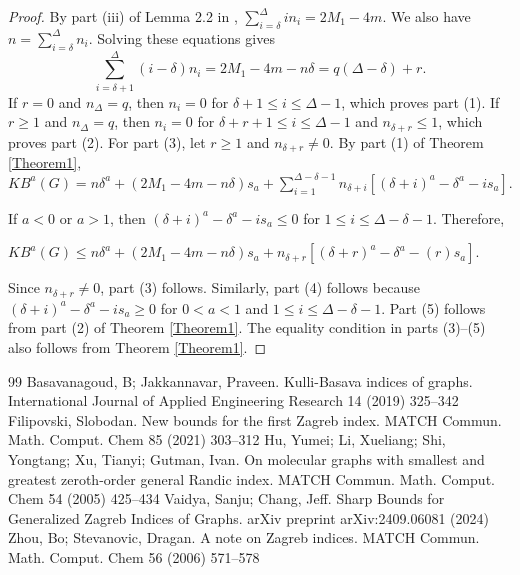 \documentclass[10pt,a4paper]{amsart}
\numberwithin{equation}{section}
\begin{document}
\begin{proof}
By part (iii) of Lemma 2.2 in \cite{basavanagoud2019kulli}, $\sum_{i=\delta}^\Delta i n_i=2M_1-4m$. We also have $n=\sum_{i=\delta}^\Delta n_i$. Solving these equations gives
\[
\sum_{i=\delta+1}^\Delta(i-\delta)n_i=2M_1-4m-n\delta=q(\Delta-\delta)+r.
\]
If $r=0$ and $n_\Delta=q$, then $n_i=0$ for $\delta+1\leq i\leq\Delta-1$, which proves part (1). If $r\geq1$ and $n_\Delta=q$, then $n_i=0$ for $\delta+r+1\leq i\leq\Delta-1$ and $n_{\delta+r}\leq1$, which proves part (2). For part (3), let $r\geq1$ and $n_{\delta+r}\neq0$. By part (1) of Theorem \ref{Theorem1},
$KB^a(G)=n\delta^a +  (2M_1 - 4m - n\delta)s_a +\sum_{i =1}^{\Delta - \delta - 1}n_{\delta + i} \left[(\delta + i)^a - \delta^a  - is_a\right].$

If $a<0$ or $a>1$, then $(\delta+i)^a-\delta^a-is_a\leq0$ for $1\leq i\leq\Delta-\delta-1$. Therefore,

$KB^a(G) \leq n\delta^a +  (2M_1 - 4m -n\delta)s_a + n_{\delta + r} \left[(\delta + r)^a - \delta^a  - (r)s_a\right].$

Since $n_{\delta+r}\neq0$, part (3) follows. Similarly, part (4) follows because $(\delta+i)^a-\delta^a-is_a\geq0$ for $0<a<1$ and $1\leq i\leq\Delta-\delta-1$. Part (5) follows from part (2) of Theorem \ref{Theorem1}. The equality condition in parts (3)--(5) also follows from Theorem \ref{Theorem1}.

\end{proof}

\begin{thebibliography}{99}
 Basavanagoud, B; Jakkannavar, Praveen. Kulli-Basava indices of graphs. International Journal of Applied Engineering Research 14 (2019) 325--342
 Filipovski, Slobodan. New bounds for the first Zagreb index. MATCH Commun. Math. Comput. Chem 85 (2021) 303--312
 Hu, Yumei; Li, Xueliang; Shi, Yongtang; Xu, Tianyi; Gutman, Ivan. On molecular graphs with smallest and greatest zeroth-order general Randic index. MATCH Commun. Math. Comput. Chem 54 (2005) 425--434
 Vaidya, Sanju; Chang, Jeff. Sharp Bounds for Generalized Zagreb Indices of Graphs. arXiv preprint arXiv:2409.06081 (2024)
 Zhou, Bo; Stevanovic, Dragan. A note on Zagreb indices. MATCH Commun. Math. Comput. Chem 56 (2006) 571--578
\end{thebibliography}
\end{document}
